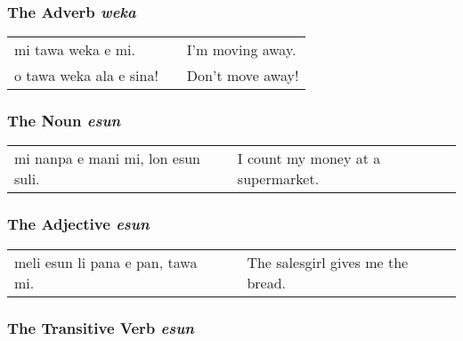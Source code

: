 %
\subsubsection*{The Adverb \textit{weka}}
%

\begin{supertabular}{p{5,5cm}|ll}
mi tawa weka e mi. && I'm moving away. \\
o tawa weka ala e sina! && Don't move away! \\
\end{supertabular} 

%
%
%
%
\subsubsection*{The Noun \textit{esun}}
%

\begin{supertabular}{p{5,5cm}|ll}
mi nanpa e mani mi, lon esun suli. && I count my money at a supermarket. \\
\end{supertabular}

%
%
\subsubsection*{The Adjective \textit{esun}}
%

\begin{supertabular}{p{5,5cm}|ll}
meli esun li pana e pan, tawa mi. && The salesgirl gives me the bread. \\
\end{supertabular}

%
%
\subsubsection*{The Transitive Verb \textit{esun}}
%

